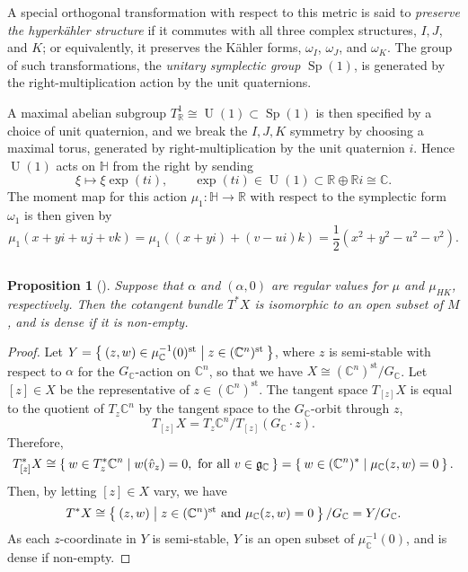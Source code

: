 \documentclass{article}
\newtheorem{prop}[theorem]{Proposition}
\newcommand{\ra}{\rightarrow}
\newcommand{\half}{\frac{1}{2}}
\newcommand{\w}{\omega}
\newcommand{\hyperkahler}{hyperk\"ahler }
\newcommand{\RR}{\mathbb{R}}
\newcommand{\CC}{\mathbb{C}}
\newcommand{\HH}{\mathbb{H}}
\newcommand{\mfg}{\mathfrak{g}}
\DeclareMathOperator{\UU}{U}
\DeclareMathOperator{\Sp}{Sp}
\DeclareMathOperator{\stable}{st}
\begin{document}
	A special orthogonal transformation with respect to this metric is said to \emph{preserve the \hyperkahler structure} if it commutes with all three complex structures, $I, J$, and $K$; or equivalently, it preserves the K{\"a}hler forms, $\w_{I}$, $\w_{J}$, and $\w_{K}$. The group of such transformations, the \emph{unitary symplectic group} $\Sp(1)$, is generated by the right-multiplication action by the unit quaternions.
	
	A maximal abelian subgroup $T_{\RR}^{1} \cong \UU(1) \subset \Sp(1)$ is then specified by a choice of unit quaternion, and we break the $I, J, K$ symmetry by choosing a maximal torus, generated by right-multiplication by the unit quaternion $i$. Hence $\UU(1)$ acts on $\HH$ from the right by sending
	\[
		\xi \mapsto \xi\exp(ti), \qquad \exp(ti) \in \UU(1) \subset \RR \oplus \RR i \cong \CC.
	\]
	The moment map for this action $\mu_{1} : \HH \ra \RR$ with respect to the symplectic form $\w_{1}$ is then given by
	\[
		\mu_{1}(x + yi + uj + vk) = \mu_{1}\left((x+yi) + (v - ui)k\right) = \half\left(x^{2} + y^{2} - u^{2} - v^{2}\right).
	\]
	
	\subsection{}
	
	\begin{prop}[\cite{Proudfoot2004}]
		Suppose that $\alpha$ and $(\alpha,0)$ are regular values for $\mu$ and $\mu_{HK}$, respectively. Then the cotangent bundle $T^{\ast}X$ is isomorphic to an open subset of $M$, and is dense if it is non-empty.
	\end{prop}

	\begin{proof}
		Let $Y = \Set{ (z,w) \in \mu_{\CC}^{-1}(0)^{\stable} | z \in (\CC^{n})^{\stable} }$, where $z$ is semi-stable with respect to $\alpha$ for the $G_{\CC}$-action on $\CC^{n}$, so that we have $X \cong (\CC^{n})^{\stable} / G_{\CC}$. Let $[z] \in X$ be the representative of $z \in (\CC^{n})^{\stable}$. The tangent space $T_{[z]}X$ is equal to the quotient of $T_{z}\CC^{n}$ by the tangent space to the $G_{\CC}$-orbit through $z$,
		\[
			T_{[z]}X = T_{z}\CC^{n} / T_{[z]}(G_{\CC} \cdot z).
		\]
		Therefore,
		\[
			T_{[z]}^{\ast}X \cong \Set{ w \in T_{z}^{\ast}\CC^{n} | w(\hat{v}_{z}) = 0, \text{ for all } v \in \mfg_{\CC} }= \Set{ w \in (\CC^{n})^{\ast} | \mu_{\CC}(z,w) = 0 }.  
		\]
		Then, by letting $[z] \in X$ vary, we have
		\[
			T^{\ast}X \cong \Set{ (z,w) | z \in (\CC^{n})^{\stable} \text{ and } \mu_{\CC}(z,w) = 0 }/G_{\CC} = Y/G_{\CC}.
		\]
		As each $z$-coordinate in $Y$ is semi-stable, $Y$ is an open subset of $\mu_{\CC}^{-1}(0)$, and is dense if non-empty.
	\end{proof}
	
\end{document}
